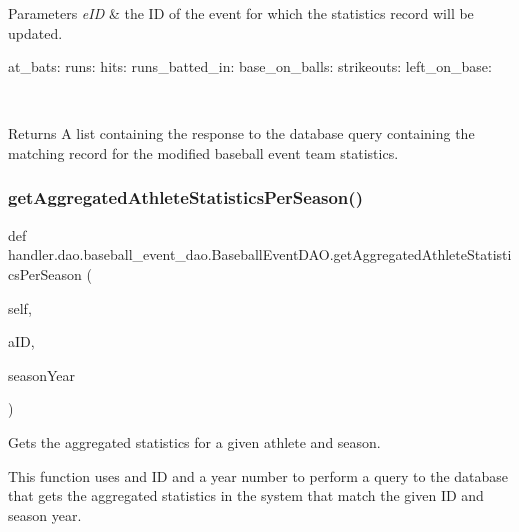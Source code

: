 \begin{DoxyParams}{Parameters}
{\em e\+ID} & the ID of the event for which the statistics record will be updated. \begin{DoxyVerb}       at_bats:
       runs:
       hits:
       runs_batted_in:
       base_on_balls:
       strikeouts:
       left_on_base:
\end{DoxyVerb}
\\
\hline
\end{DoxyParams}
\begin{DoxyReturn}{Returns}
A list containing the response to the database query containing the matching record for the modified baseball event team statistics. 
\end{DoxyReturn}
\mbox{\label{classhandler_1_1dao_1_1baseball__event__dao_1_1_baseball_event_d_a_o_a5bb1c3b009fcd9a61c367d3d11b4d45e}} 
\subsubsection{\texorpdfstring{get\+Aggregated\+Athlete\+Statistics\+Per\+Season()}{getAggregatedAthleteStatisticsPerSeason()}}
{\footnotesize\ttfamily def handler.\+dao.\+baseball\+\_\+event\+\_\+dao.\+Baseball\+Event\+D\+A\+O.\+get\+Aggregated\+Athlete\+Statistics\+Per\+Season (\begin{DoxyParamCaption}\item[{}]{self,  }\item[{}]{a\+ID,  }\item[{}]{season\+Year }\end{DoxyParamCaption})}



Gets the aggregated statistics for a given athlete and season. 

This function uses and ID and a year number to perform a query to the database that gets the aggregated statistics in the system that match the given ID and season year.


